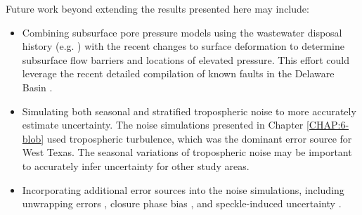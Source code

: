 Future work beyond extending the results presented here may include:

\begin{itemize}



\item Combining subsurface pore pressure models using the wastewater disposal history (e.g. \cite{Ge2022RecentWaterDisposal}) with the recent changes to surface deformation to determine subsurface flow barriers and locations of elevated pressure. This effort could leverage the recent detailed compilation of known faults in the Delaware Basin \citep{Horne2021BasementRootedFaults}.



\item Simulating both seasonal and stratified tropospheric noise to more accurately estimate uncertainty. The noise simulations presented in Chapter \ref{CHAP:6-blob} used tropospheric turbulence, which was the dominant error source for West Texas. The seasonal variations of tropospheric noise may be important to accurately infer uncertainty for other study areas.

\item Incorporating additional error sources into the noise simulations, including unwrapping errors \citep{Yunjun2019SmallBaselineInsar}, closure phase bias \citep{Zheng2022ClosurePhaseSystematic}, and speckle-induced uncertainty \citep{Zwieback2022ReliableInsarPhase}. 


\end{itemize}
